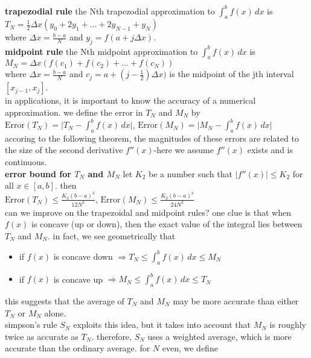 \documentclass{article}
\begin{document}
\textbf{trapezodial rule} the Nth trapezodial approximation to $\int_{a}^{b}f(x)\,dx$ is\\
$T_N = \frac{1}{2}\Delta x(y_0 + 2y_1 + \ldots + 2y_{N-1} + y_N)$\\
where $\Delta x = \frac{b - a}{N}$ and $y_j = f(a + j\Delta x)$.\\

\textbf{midpoint rule} the Nth midpoint approximation to $\int_{a}^{b}f(x)\,dx$ is\\
$M_N = \Delta x(f(c_1) + f(c_2) + \ldots + f(c_N))$\\
where $\Delta x = \frac{b - a}{N}$ and $c_j = a + (j - \frac{1}{2})\Delta x)$ is the midpoint of the jth interval $[x_{j-1}, x_j]$.\\

in applications, it is important to know the accuracy of a numerical approximation. we define the error in $T_N$ and $M_N$ by\\
$\text{Error}(T_N) = \lvert T_N - \int_{a}^{b}f(x)\,dx\rvert$, $\text{Error}(M_N) = \lvert M_N - \int_{a}^{b}f(x)\,dx\rvert$\\
accoring to the following theorem, the magnitudes of these errors are related to the size of the second derivative $f''(x)$-here we assume $f''(x)$ exists and is continuous.\\

\textbf{error bound for $T_N$ and $M_N$} let $K_2$ be a number such that $\lvert f''(x)\rvert \leq K_2$ for all $x \in [a, b]$. then\\
$\text{Error}(T_N) \leq \frac{K_2(b-a)^3}{12N^2}$, $\text{Error}(M_N) \leq \frac{K_2(b - a)^3}{24N^2}$\\

can we improve on the trapezoidal and midpoint rules? one clue is that when $f(x)$ is concave (up or down), then the exact value of the integral lies between $T_N$ and $M_N$. in fact, we see geometrically that
	\begin{itemize}
		\item if $f(x)$ is concave down $\Rightarrow T_N \leq \int_{a}^{b}f(x)\,dx \leq M_N$
		\item if $f(x)$ is concave up $\Rightarrow M_N \leq \int_{a}^{b}f(x)\,dx \leq T_N$ 
	\end{itemize}
this suggests that the average of $T_N$ and $M_N$ may be more accurate than either $T_N$ or $M_N$ alone.\\ simpson's rule $S_N$ exploits this idea, but it takes into account that $M_N$ is roughly twice as accurate as $T_N$. therefore, $S_N$ uses a weighted average, which is more accurate than the ordinary average. for $N$ even, we define\\
\end{document}
